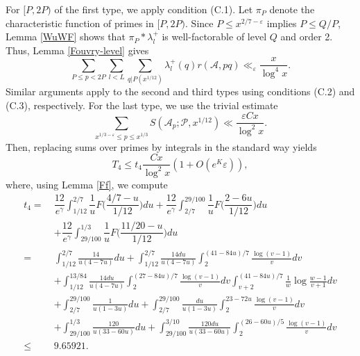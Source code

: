 \documentclass[12pt, a4paper]{amsart}
\def\leq{\leqslant}
\def\le{\leqslant}
\theoremstyle{plain}
\theoremstyle{remark}
\numberwithin{equation}{section}
\begin{document}
For $[P, 2P)$ of the first type, we apply condition (C.1). Let \( \pi_P \) denote the characteristic 
function of primes in \( [P, 2P) \). Since \( P \leqslant x^{2/7-\varepsilon} \) implies \( P \leqslant Q/P \), 
Lemma \ref{WuWF} shows that \( \pi_P * \lambda_{l}^{+} \) is well-factorable of level \( Q \) and order 2. 
Thus, Lemma \ref{Fouvry-level} gives
\begin{equation}
\sum_{P\leqslant p<2P}\sum_{l<L}\sum_{q|P(x^{1/12})} 
\lambda_{l}^{+}(q)r(\mathscr{A},pq) \ll_{\varepsilon} \frac{x}{\log^{4} x}. 
\end{equation}
Similar arguments apply to the second and third types 
using conditions (C.2) and (C.3), respectively. For the last type, we use the trivial estimate
\begin{equation}
\sum_{x^{1/3-\varepsilon} \leq p \le x^{1/3}} S(\mathscr{A}_p; \mathscr{P}, x^{1/12}) 
\ll \dfrac{\varepsilon Cx}{\log ^2 x}. 
\end{equation}
Then, replacing sums over primes by integrals in the standard way yields
\begin{equation}\label{T4}
T_4 \le t_4\dfrac{Cx}{\log^2 x}(1+O(e^K\varepsilon)),
\end{equation}
where, using Lemma \ref{Ff}, we compute
\begin{equation}\label{t4}
\begin{aligned}
t_4=\ &\dfrac{12}{e^\gamma}\int_{1/12}^{2/7}\dfrac{1}{u}F\bigg(\dfrac{4/7-u}{1/12}\bigg)du+\dfrac{12}{e^\gamma}\int_{2/7}^{29/100}\dfrac{1}{u}F\bigg(\dfrac{2-6u}{1/12}\bigg)du\\
	&+\dfrac{12}{e^\gamma}\int_{29/100}^{1/3}\dfrac{1}{u}F\bigg(\dfrac{11/20-u}{1/12}\bigg)du\\
	=\ &\int_{1/12}^{2/7} \frac{14}{u(4-7u)}du+\int_{1/12}^{2/7} \frac{14du}{u(4-7u)}\int_2^{(41-84u)/7} \frac{\log (v-1)}{v} d v\\
	&+\int_{1/12}^{13/84} \frac{14du}{u(4-7u)}\int_2^{(27-84u)/7} \frac{\log (v-1)}{v} d v \int_{v+2}^{(41-84u)/7} \frac{1}{w} \log \frac{w-1}{v+1} dv\\
	&+\int_{2/7}^{29/100}\frac{1}{u(1-3u)}du + \int_{2/7}^{29/100}\frac{du}{u(1-3u)}\int_{2}^{23-72u}\frac{\log(v-1)}{v}dv\\
	&+\int_{29/100}^{1/3}\frac{120}{u(33-60u)}du + \int_{29/100}^{3/10}\frac{120du}{u(33-60u)}\int_{2}^{(26-60u)/5}\frac{\log(v-1)}{v}dv\\
	\le\ & 9.65921.
\end{aligned}
\end{equation}
\end{document}
